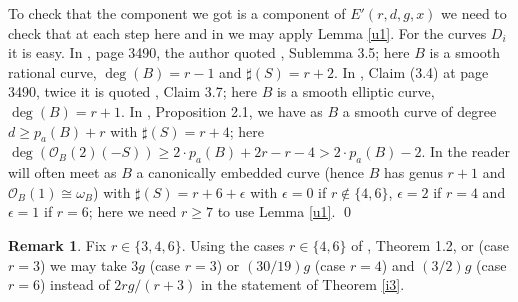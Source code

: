 \documentclass{amsart}
\theoremstyle{plain}
\theoremstyle{definition}
\newtheorem{remark}{Remark}
\begin{document}
To check that the component we got is a component of $E'(r,d,g,x)$ we need to check that at each step here and in \cite{l2} we may apply Lemma \ref{u1}. For the curves $D_i$ it is easy. In \cite{l2}, page 3490, the author quoted
\cite{l1}, Sublemma 3.5; here $B$ is a smooth rational curve, $\deg (B)=r-1$ and $\sharp (S) =r+2$. In \cite{l2}, Claim (3.4) at page 3490, twice it is quoted \cite{l1}, Claim 3.7; here $B$ is a smooth elliptic curve,
$\deg (B)=r+1$. In \cite{l1}, Proposition 2.1, we have as $B$ a smooth curve of degree $d\ge p_a(B)+r$ with $\sharp (S) =r+4$; here $\deg (\mathcal {O}_B(2)(-S)) \ge 2\cdot p_a(B) +2r-r-4 > 2\cdot p_a(B)-2$. In \cite{l2} the reader will often meet
as $B$ a canonically embedded curve (hence $B$ has genus $r+1$ and $\mathcal {O}_B(1) \cong \omega _B$) with $\sharp (S) =r+6+ \epsilon $
with $\epsilon = 0$ if $r\notin \{4,6\}$, $\epsilon = 2$ if $r=4$ and $\epsilon =1$ if $r=6$; here we need $r\ge 7$ to use Lemma \ref{u1}. \qed

\begin{remark}\label{b1}
Fix $r\in \{3,4,6\}$. Using the cases $r\in \{4,6\}$ of \cite{l2}, Theorem 1.2,  or \cite{p} (case $r=3$) we may take
$3g$ (case $r=3$) or $(30/19)g$ (case  $r=4$) and $(3/2)g$ (case $r=6$) instead of $2rg/(r+3)$ in the statement of Theorem \ref{i3}.
\end{remark}




\providecommand{\bysame}{\leavevmode\hbox to3em{\hrulefill}\thinspace}
\end{document}
